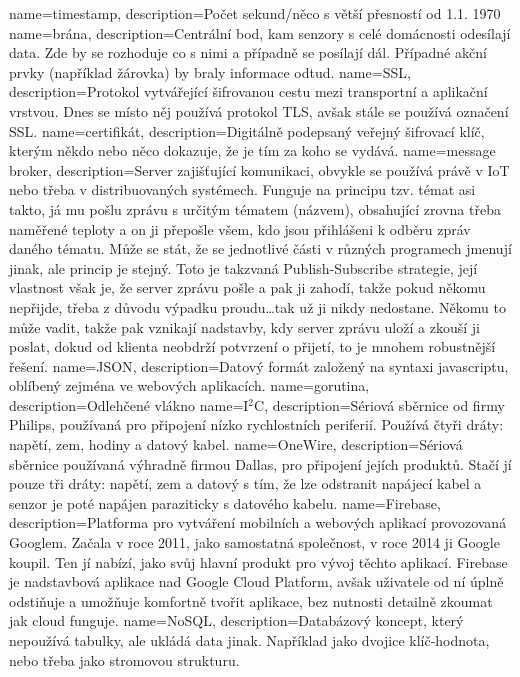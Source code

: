 {
  name={timestamp},
  description={Počet sekund/něco s větší přesností od 1.1. 1970}
}
{
  name={brána},
  description={Centrální bod, kam senzory s celé domácnosti odesílají data. Zde by se rozhoduje co s nimi a případně se 
  posílají dál. Případné akční prvky (například žárovka) by braly informace odtud.}
}
{
  name={SSL},
  description={Protokol vytvářející šifrovanou cestu mezi transportní a aplikační vrstvou. Dnes se místo něj používá 
protokol TLS, avšak stále se používá označení SSL.}
}
{
  name={certifikát},
  description={Digitálně podepsaný veřejný šifrovací klíč, kterým někdo nebo něco dokazuje, že je tím za koho se 
vydává.}
}
{
  name={message broker},
  description={Server zajišťující komunikaci, obvykle se používá právě v IoT nebo třeba v distribuovaných systémech. 
Funguje na principu tzv. témat asi takto, já mu pošlu zprávu s určitým tématem (názvem), obsahující zrovna třeba 
naměřené teploty a on ji přepošle všem, kdo jsou přihlášeni k odběru zpráv daného tématu. Může se stát, že se jednotlivé 
části v různých programech jmenují jinak, ale princip je stejný. Toto je takzvaná Publish-Subscribe strategie, její 
vlastnost však je, že server zprávu pošle a pak ji zahodí, takže pokud někomu nepřijde, třeba z důvodu výpadku 
proudu\ldots tak už ji nikdy nedostane. Někomu to může vadit, takže pak vznikají nadstavby, kdy server zprávu uloží 
a zkouší ji poslat, dokud od klienta neobdrží potvrzení o přijetí, to je mnohem robustnější řešení.}
}
{
  name={JSON},
  description={Datový formát založený na syntaxi javascriptu, oblíbený zejména ve webových aplikacích.}
}
{
  name={gorutina},
  description={Odlehčené vlákno}
}
{
  name={I$^2$C},
  description={Sériová sběrnice od firmy Philips, používaná pro připojení nízko rychlostních periferií. Používá čtyři 
dráty: napětí, zem, hodiny a datový kabel.}
}
{
  name={OneWire},
  description={Sériová sběrnice používaná výhradně firmou Dallas, pro připojení jejích produktů. Stačí jí pouze tři 
dráty: napětí, zem a datový s tím, že lze odstranit napájecí kabel a senzor je poté napájen paraziticky s datového 
kabelu.}
}
{
  name={Firebase},
  description={Platforma pro vytváření mobilních a webových aplikací provozovaná Googlem. Začala v roce 2011, jako 
samostatná společnost, v roce 2014 ji Google koupil. Ten jí nabízí, jako svůj hlavní produkt pro vývoj těchto aplikací. 
Firebase je nadstavbová aplikace nad Google Cloud Platform, avšak uživatele od ní úplně odstiňuje a umožňuje komfortně 
tvořit aplikace, bez nutnosti detailně zkoumat jak cloud funguje.}
}
{
  name={NoSQL},
  description={Databázový koncept, který nepoužívá tabulky, ale ukládá data jinak. Například jako dvojice klíč-hodnota, 
nebo třeba jako stromovou strukturu.}
}

